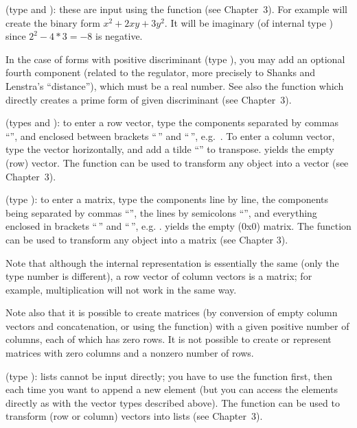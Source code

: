 %
(type  and ):
these are input using the function  (see Chapter~3). For example
 will create the binary form $x^2+2xy+3y^2$. It will be
imaginary (of internal type ) since $2^2 - 4*3 = -8$ is negative.

In the case of forms with positive discriminant (type ), you
may add an optional fourth component (related to the regulator, more
precisely to Shanks and Lenstra's ``distance''), which must be a real number.
See also the function  which directly creates a prime form
of given discriminant (see Chapter~3).

 (types
 and ): to enter a row vector, type the components
separated by commas ``\kbd{,}'', and enclosed between brackets
``\kbd{[}$\,$'' and ``$\,$\kbd{]}'', e.g.~\kbd{[1,2,3]}. To enter a column
vector, type the vector horizontally, and add a tilde ``\til'' to
transpose. \kbd{[ ]} yields the empty (row) vector. The function 
can be used to transform any object into a vector (see Chapter~3).

 (type ): to enter a matrix, type
the components line by line, the components being separated by commas
``\kbd{,}'', the lines by semicolons ``\kbd{;}'', and everything enclosed
in brackets ``\kbd{[}$\,$'' and ``$\,$\kbd{]}'', e.g. \kbd{[x,y; z,t;
u,v]}. \kbd{[ ; ]} yields the empty (0x0) matrix. The function 
can be used to transform any object into a matrix (see Chapter 3).

Note that although the internal representation is essentially the same (only
the type number is different), a row vector of column vectors is 
a matrix; for example, multiplication will not work in the same way.

Note also that it is possible to create matrices (by conversion of empty
column vectors and concatenation, or using the  function) with a
given positive number of columns, each of which has zero rows. It is not
possible to create or represent matrices with zero columns and a nonzero
number of rows.

 (type ): lists cannot be input
directly; you have to use the function  first, then
 each time you want to append a new element (but you can
access the elements directly as with the vector types described above). The
function  can be used to transform (row or column) vectors into
lists (see Chapter~3).

